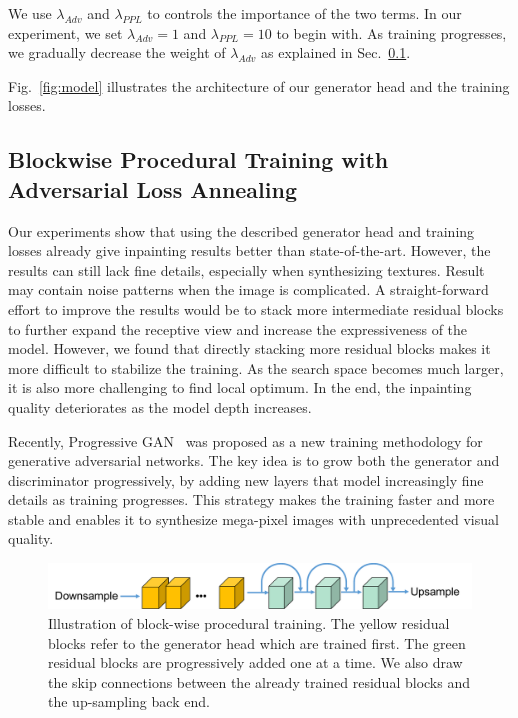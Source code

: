 We use $\lambda_{Adv}$ and $\lambda_{PPL}$ to controls the importance of the two terms. In our experiment, we set $\lambda_{Adv}=1$ and $\lambda_{PPL}=10$ to begin with. As training progresses, we gradually decrease the weight of $\lambda_{Adv}$ as explained in Sec.~\ref{sec:procedural}.

Fig.~\ref{fig:model} illustrates the architecture of our generator head and the training losses.

\subsection{Blockwise Procedural Training with Adversarial Loss Annealing}
\label{sec:procedural}
Our experiments show that using the described generator head and training losses already give inpainting results better than state-of-the-art. However, the results can still lack fine details, especially when synthesizing textures. Result may contain noise patterns when the image is complicated. A straight-forward effort to improve the results would be to stack more intermediate residual blocks to further expand the receptive view and increase the expressiveness of the model. However, we found that directly stacking more residual blocks makes it more difficult to stabilize the training. As the search space becomes much larger, it is also more challenging to find local optimum. In the end, the inpainting quality deteriorates as the model depth increases.

Recently, Progressive GAN~\cite{karras2017progressive} was proposed as a new training methodology for generative adversarial networks. The key idea is to grow both the generator and discriminator progressively, by adding new layers that model increasingly fine details as training progresses. This strategy makes the training faster and more stable and enables it to synthesize mega-pixel images with unprecedented visual quality.  

\begin{figure}[t]
\centering
\small
\includegraphics[width=1\textwidth]{figures/proc.pdf}
\caption{Illustration of block-wise procedural training. The yellow residual blocks refer to the generator head which are trained first. The green residual blocks are progressively added one at a time. We also draw the skip connections between the already trained residual blocks and the up-sampling back end.}
\label{fig:proc}
\vspace{-20pt}
\end{figure}


